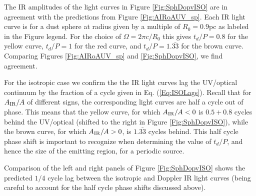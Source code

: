 
The IR amplitudes of the light curves in Figure \ref{Fig:SphDopvISO} are in
agreement with the predictions from Figure \ref{Fig:AIRoAUV_sp}. Each IR light
curve is for a dust sphere at radius given by a multiple of $R_0 = 0.9$pc as
labeled in the Figure legend. For the choice of $\Omega = 2\pi c/R_0$ this
gives $t_d/P = 0.8$ for the yellow curve, $t_d/P = 1$ for the red curve, and
$t_d/P = 1.\bar{33}$ for the brown curve. Comparing Figures \ref{Fig:AIRoAUV_sp} and
\ref{Fig:SphDopvISO}, we find agreement.

For the isotropic case we confirm the the IR light curves lag the UV/optical
continuum by the fraction of a cycle given in Eq. (\ref{Eq:ISOLags}).
Recall that for $A_{\rm{IR}}/A$ of different signs, the corresponding light
curves are half a cycle out of phase. This means that the yellow curve, for
which $A_{\rm{IR}}/A < 0$ is $0.5 + 0.8$ cycles behind the UV/optical (shifted
to the right in Figure \ref{Fig:SphDopvISO}), while the brown curve, for which
$A_{\rm{IR}}/A > 0$, is $1.\bar{33}$ cycles behind. This half cycle phase
shift is important to recognize when determining the value of $t_d/P$, and
hence the size of the emitting region, for a periodic source.


Comparison of the left and right panels of Figure \ref{Fig:SphDopvISO} shows
the predicted $1/4$ cycle lag between the isotropic and Doppler IR light
curves (being careful to account for the half cycle phase shifts discussed
above).






